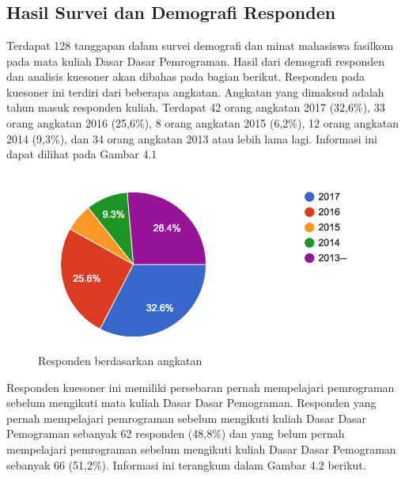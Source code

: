 \chapter{\babEmpat}
\section{Hasil Survei dan Demografi Responden}
Terdapat 128 tanggapan dalam survei demografi dan minat mahasiswa fasilkom pada mata kuliah Dasar Dasar Pemrograman. Hasil dari demografi responden dan analisis kuesoner akan dibahas pada bagian berikut.
\linebreak\linebreak
	Responden pada kuesoner ini terdiri dari beberapa angkatan. Angkatan yang dimaksud adalah tahun masuk responden kuliah. Terdapat 42 orang angkatan 2017 (32,6\%), 33 orang angkatan 2016 (25,6\%), 8 orang angkatan 2015 (6,2\%), 12 orang angkatan 2014 (9,3\%), dan 34 orang angkatan 2013 atau lebih lama lagi. Informasi ini dapat dilihat pada Gambar 4.1
	\begin{figure}
		\includegraphics{pics/angkatan}
		\caption{Responden berdasarkan angkatan}
		\centering
	\end{figure}
	Responden kuesoner ini memiliki persebaran pernah mempelajari pemrograman sebelum mengikuti mata kuliah Dasar Dasar Pemograman. Responden yang pernah mempelajari pemrograman sebelum mengikuti kuliah Dasar Dasar Pemograman sebanyak 62 responden (48,8\%) dan yang belum pernah mempelajari pemrograman sebelum mengikuti kuliah Dasar Dasar Pemograman sebanyak 66 (51,2\%). Informasi ini terangkum dalam Gambar 4.2 berikut.
